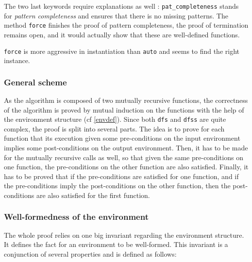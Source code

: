 \documentclass[a4 paper, 12pt]{article}
\begin{document}
The two last keywords require explanations as well : \texttt{pat\_completeness} stands for \textit{pattern completeness} and ensures that there is no missing patterns. The method \texttt{force} finishes the proof of pattern completeness, the proof of termination remains open, and it would actually show that these are well-defined functions. {\texttt{force} is more aggressive in instantiation than \texttt{auto} and seems to find the right instance.

\subsubsection{General scheme}
As the algorithm is composed of two mutually recursive functions, the correctness of the algorithm is proved by mutual induction on the functions with the help of the environment structure (cf \ref{envdef}). Since both \texttt{dfs} and \texttt{dfss} are quite complex, the proof is split into several parts. The idea is to prove for each function that its execution given some pre-conditions on the input environment implies some post-conditions on the output environment. Then, it has to be made for the mutually recursive calls as well, so that given the same pre-conditions on one function, the pre-conditions on the other function are also satisfied. Finally, it has to be proved that if the pre-conditions are satisfied for one function, and if the pre-conditions imply the post-conditions on the other function, then the post-conditions are also satisfied for the first function.

\subsubsection{Well-formedness of the environment}
The whole proof relies on one big invariant regarding the environment structure. It defines the fact for an environment to be well-formed. This invariant is a conjunction of several properties and is defined as follows:

}
\end{document}
